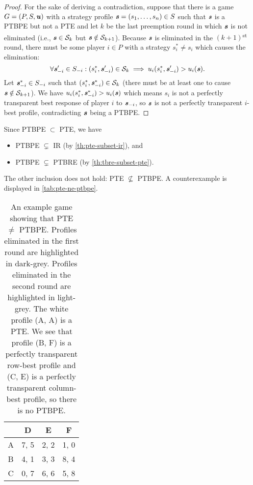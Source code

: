 \begin{proof}
	For the sake of deriving a contradiction, suppose that there is a game $G = (P, S, \boldsymbol{\mathit{u}})$ with a strategy profile $\boldsymbol{\mathit{s}} = (s_1, \dots, s_n) \in S$ such that $\boldsymbol{\mathit{s}}$ is a PTBPE but not a PTE and let $k$ be the last preemption round in which $\boldsymbol{\mathit{s}}$ is not eliminated (i.e., $\boldsymbol{\mathit{s}} \in \mathcal{S}_k$ but $\boldsymbol{\mathit{s}} \notin \mathcal{S}_{k+1}$).
	Because $\boldsymbol{\mathit{s}}$ is eliminated in the $(k+1)$\textsuperscript{st} round, there must be some player $i \in P$ with a strategy $s_i^* \ne s_i$ which causes the elimination:
	\[
		\forall \boldsymbol{\mathit{s}}_{-i}' \in S_{-i}: (s_i^*, \boldsymbol{\mathit{s}}_{-i}') \in \mathcal{S}_k \implies u_i(s_i^*, \boldsymbol{\mathit{s}}_{-i}') > u_i(\boldsymbol{\mathit{s}}).
	\]
	Let $\boldsymbol{\mathit{s}}_{-i}^* \in S_{-i}$ such that $(s_i^*, \boldsymbol{\mathit{s}}_{-i}^*)\in \mathcal{S}_k$ (there must be at least one to cause $\boldsymbol{\mathit{s}} \notin \mathcal{S}_{k+1}$).
	We have $u_i(s_i^*, \boldsymbol{\mathit{s}}_{-i}^*) > u_i(\boldsymbol{\mathit{s}})$ which means $s_i$ is not a perfectly transparent best response of player $i$ to $\boldsymbol{\mathit{s}}_{-i}$, so $\boldsymbol{\mathit{s}}$ is not a perfectly transparent $i$-best profile, contradicting $\boldsymbol{\mathit{s}}$ being a PTBPE.
\end{proof}

\begin{corollary}
	Since PTBPE $\subset$ PTE, we have
	\begin{itemize}
		\item PTBPE $\subsetneq$ IR (by \autoref{th:pte-subset-ir}), and
		\item PTBPE $\subsetneq$ PTBRE (by \autoref{th:tbre-subset-pte}).
	\end{itemize}
\end{corollary}

\begin{remark}
	The other inclusion does not hold: PTE $\not\subseteq$ PTBPE.
	A counterexample is displayed in \autoref{tab:pte-ne-ptbpe}.
\end{remark}

\begin{table}
	\caption{
		An example game showing that PTE $\ne$ PTBPE.
		Profiles eliminated in the first round are highlighted in \colorbox{gray!70}{dark-grey}.
		Profiles eliminated in the second round are highlighted in \colorbox{gray!20}{light-grey}.
		The white profile (A, A) is a PTE.
		We see that profile (B, F) is a perfectly transparent row-best profile and (C, E) is a perfectly transparent column-best profile, so there is no PTBPE.
	}
	\label{tab:pte-ne-ptbpe}
	\centering
	\begin{tabular}{|c|c|c|c|}
		\hline
			& D		& E	   & F	  \\
		\hline
		A 		&\cellcolor{gray!00} 7, 5 &\cellcolor{gray!70} 2, 2 &\cellcolor{gray!70} 1, 0 \\
		\hline
		B		&\cellcolor{gray!70} 4, 1 &\cellcolor{gray!20} 3, 3 &\cellcolor{gray!20} 8, 4 \\
		\hline
		C		&\cellcolor{gray!70} 0, 7 &\cellcolor{gray!20} 6, 6 &\cellcolor{gray!20} 5, 8 \\
		\hline
	\end{tabular}
\end{table}

